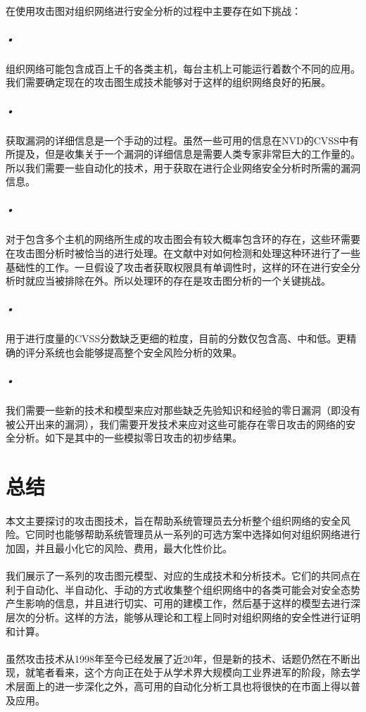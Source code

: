 \documentclass[12pt,a4paper]{article}
\begin{document}
\paragraph{}
在使用攻击图对组织网络进行安全分析的过程中主要存在如下挑战：
\subparagraph{•}
组织网络可能包含成百上千的各类主机，每台主机上可能运行着数个不同的应用。我们需要确定现在的攻击图生成技术能够对于这样的组织网络良好的拓展。
\subparagraph{•}
获取漏洞的详细信息是一个手动的过程。虽然一些可用的信息在NVD的CVSS中有所提及，但是收集关于一个漏洞的详细信息是需要人类专家非常巨大的工作量的。所以我们需要一些自动化的技术，用于获取在进行企业网络安全分析时所需的漏洞信息。
\subparagraph{•}
对于包含多个主机的网络所生成的攻击图会有较大概率包含环的存在，这些环需要在攻击图分析时被恰当的进行处理。在文献\cite{24}\cite{25}中对如何检测和处理这种环进行了一些基础性的工作。一旦假设了攻击者获取权限具有单调性时，这样的环在进行安全分析时就应当被排除在外。所以处理环的存在是攻击图分析的一个关键挑战。
\subparagraph{•}
用于进行度量的CVSS分数缺乏更细的粒度，目前的分数仅包含高、中和低。更精确的评分系统也会能够提高整个安全风险分析的效果。
\subparagraph{•}
我们需要一些新的技术和模型来应对那些缺乏先验知识和经验的零日漏洞（即没有被公开出来的漏洞），我们需要开发技术来应对这些可能存在零日攻击的网络的安全分析。如下是其中的一些模拟零日攻击的初步结果\cite{26}。


\section{总结}
\paragraph{}
本文主要探讨的攻击图技术，旨在帮助系统管理员去分析整个组织网络的安全风险。它同时也能够帮助系统管理员从一系列的可选方案中选择如何对组织网络进行加固，并且最小化它的风险、费用，最大化性价比。
\paragraph{}
我们展示了一系列的攻击图元模型、对应的生成技术和分析技术。它们的共同点在利于自动化、半自动化、手动的方式收集整个组织网络中的各类可能会对安全态势产生影响的信息，并且进行切实、可用的建模工作，然后基于这样的模型去进行深层次的分析。这样的方法，能够从理论和工程上同时对组织网络的安全性进行证明和计算。
\paragraph{}
虽然攻击技术从1998年至今已经发展了近20年，但是新的技术、话题仍然在不断出现，就笔者看来，这个方向正在处于从学术界大规模向工业界进军的阶段，除去学术层面上的进一步深化之外，高可用的自动化分析工具也将很快的在市面上得以普及应用。
\end{document}
